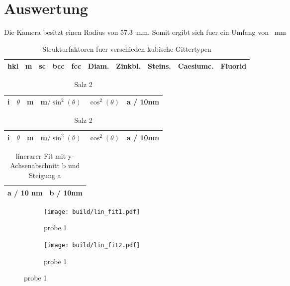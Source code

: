 \section{Auswertung}\label{sec:Auswertung}

Die Kamera besitzt einen Radius von \SI{57.3}{\milli\meter}.
Somit ergibt sich fuer ein Umfang von \SI{}{\milli\meter}

\begin{table}[h]
		\centering
		\caption{Strukturfaktoren fuer verschieden kubische Gittertypen}
		\label{tab:label}
		\begin{tabular}{c c c c c c c c c c}
				\toprule
				hkl & m & sc & bcc & fcc & Diam. & Zinkbl. & Steins. & Caesiumc. & Fluorid \\ 
				\midrule
					
				\bottomrule
		\end{tabular}
\end{table}

\begin{table}[h]
		\centering
		\caption{Reflexe der Proben}
		\label{tab:label}
		\begin{subtable}{0.9\textwidth}
				\centering
				\caption{Probe 2}
				\begin{tabular}{c c c c c c}
						\toprule
						i & $\theta$ & m & m$/\sin^2(\theta)$ & $\cos^2(\theta)$ & a / 10nm \\ 
						\midrule
						
						\bottomrule
				\end{tabular}
		\end{subtable}
		\begin{subtable}{0.9\textwidth}
				\centering
				\caption{Salz 2}
				\begin{tabular}{c c c c c c}
						\toprule
						i & $\theta$ & m & m$/\sin^2(\theta)$ & $\cos^2(\theta)$ & a / 10nm \\ 
						\midrule
						
						\bottomrule
				\end{tabular}
		\end{subtable}
\end{table}

\begin{table}[ht]
		\centering
		\caption{linerarer Fit mit y-Achsenabschnitt b und Steigung a}
		\label{tab:label}
		\begin{tabular}{c c}
				\toprule
				a / 10 nm & b / 10nm \\
				\midrule
				
				
				\bottomrule
		\end{tabular}
\end{table}

\begin{figure}[h]
		\centering
		\begin{subfigure}{0.49\textwidth}
				\centering
				\texttt{[image: build/lin\_fit1.pdf]}
				\caption{probe 1}
				\label{fig:prb1}
		\end{subfigure}
		\begin{subfigure}{0.49\textwidth}
				\centering
				\texttt{[image: build/lin\_fit2.pdf]}
				\caption{probe 1}
				\label{fig:prb1}
		\end{subfigure}
\end{figure}

